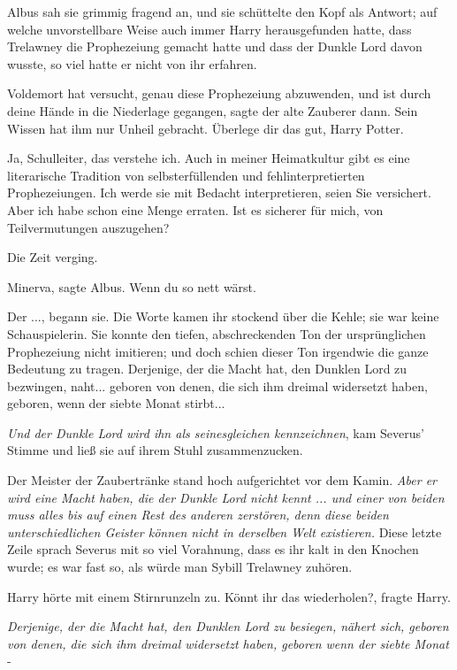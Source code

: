 Albus sah sie grimmig fragend an, und sie schüttelte den Kopf als Antwort; auf
welche unvorstellbare Weise auch immer Harry herausgefunden hatte, dass
Trelawney die Prophezeiung gemacht hatte und dass der Dunkle Lord davon wusste,
so viel hatte er nicht von ihr erfahren.

\glqq{}Voldemort hat versucht, genau diese Prophezeiung abzuwenden, und ist durch
deine Hände in die Niederlage gegangen\grqq{}, sagte der alte Zauberer dann.
\glqq{}Sein Wissen hat ihm nur Unheil gebracht. Überlege dir das gut, Harry
Potter.\grqq{}

\glqq{}Ja, Schulleiter, das verstehe ich. Auch in meiner Heimatkultur gibt es
eine literarische Tradition von selbsterfüllenden und fehlinterpretierten
Prophezeiungen. Ich werde sie mit Bedacht interpretieren, seien Sie versichert.
Aber ich habe schon eine Menge erraten. Ist es sicherer für mich, von
Teilvermutungen auszugehen?\grqq{}

Die Zeit verging.

\glqq{}Minerva\grqq{}, sagte Albus. \glqq{}Wenn du so nett wärst.\grqq{}

\glqq{}Der ...\grqq{}, begann sie. Die Worte kamen ihr stockend über die Kehle;
sie war keine Schauspielerin. Sie konnte den tiefen, abschreckenden Ton der
ursprünglichen Prophezeiung nicht imitieren; und doch schien dieser Ton
irgendwie die ganze Bedeutung zu tragen. \glqq{}Derjenige, der die Macht hat, den
Dunklen Lord zu bezwingen, naht... geboren von denen, die sich ihm dreimal
widersetzt haben, geboren, wenn der siebte Monat stirbt...\grqq{}

\glqq{}\emph{Und der Dunkle Lord wird ihn als seinesgleichen
kennzeichnen}\grqq{}, kam Severus' Stimme und ließ sie auf ihrem Stuhl
zusammenzucken.

Der Meister der Zaubertränke stand hoch aufgerichtet vor dem Kamin. \glqq{}
\emph{Aber er wird eine Macht haben, die der Dunkle Lord nicht kennt ... und
einer von beiden muss alles bis auf einen Rest des anderen zerstören, denn diese
beiden unterschiedlichen Geister können nicht in derselben Welt existieren.}\grqq{}
Diese letzte Zeile sprach Severus mit so viel Vorahnung, dass es ihr kalt in den
Knochen wurde; es war fast so, als würde man Sybill Trelawney zuhören.

Harry hörte mit einem Stirnrunzeln zu. \glqq{}Könnt ihr das wiederholen?\grqq{},
fragte Harry.

\glqq{}\emph{Derjenige, der die Macht hat, den Dunklen Lord zu besiegen, nähert
sich, geboren von denen, die sich ihm dreimal widersetzt haben, geboren wenn der
siebte Monat} -\grqq{}

